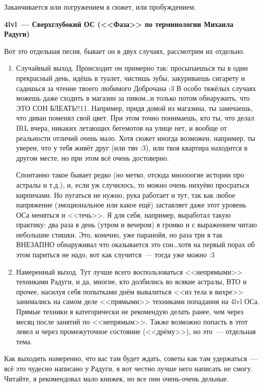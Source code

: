 \documentclass[a4paper,14pt,oneside]{memoir}
\begin{document}
Заканчивается или погружением в сюжет, или пробуждением.



\begin{center}
\textbf{4lvl~--- Сверхглубокий ОС (<<Фаза>> по терминологии Михаила Радуги)}
\end{center}


Вот это отдельная песня, бывает он в двух случаях, рассмотрим их отдельно.
\begin{enumerate}
\item Случайный выход. Происходит он примерно так: просыпаешься ты в один прекрасный день, идёшь в туалет, чистишь зубы, закуриваешь сигарету и садишься за чтение твоего любимого Доброчана :3 В особо тяжёлых случаях можешь даже сходить в магазин за пивом\ldots и только потом обнаружить, что ЭТО СОН БЛЕАТЬ!!11. Например, придя домой из магазина, ты замечаешь, что диван поменял свой цвет. При этом точно понимаешь, кто ты, что делал IRL вчера, никаких летающих бегемотов на улице нет, и вообще от реальности отличий очень мало. Хотя сюжет иногда возможен, например, ты уверен, что у тебя живёт друг (или тян :3), или твоя квартира находится в другом месте, но при этом всё очень достоверно.

Спонтанно такое бывает редко (но метко, отсюда мноооогие истории про астралы и т.д.), и, если уж случилось, то можно очень нихуёво просраться кирпичами. Но пугаться не нужно, рука работает и тут, так как любое напряжение (эмоциональное или какое ещё) заставляет даже этот уровень ОСа меняться и <<течь>>. Я для себя, например, выработал такую практику: два раза в день (утром и вечером) я громко и с выражением читаю небольшие стишки. Это, конечно, уже паранойя, но раза три я так ВНЕЗАПНО обнаруживал что оказывается это сон\ldots хотя на первый порах об этом париться не надо, вот как случится~--- тогда уже можно :3
\item Намеренный выход. Тут лучше всего воспользоваться <<не\-пря\-мы\-ми>> техниками Радуги, и да, многие, кто долбились во всякие астралы, ВТО и прочее, насилуя себя попытками днём вывалиться <<из тела в вихре>> занимались на самом деле <<прямыми>> техниками попадания на 4lvl ОСа. Прямые техники я категорически не рекомендую делать ранее, чем через месяц после занятий по <<непрямым>>. Также возможно попасть в этот левел и через промежуточное состояние (<<дрёму>>), но это~--- отдельная тема.
\end{enumerate} 
 
Как выходить намеренно, что вас там будет ждать, советы как там удержаться~--- всё это чудесно написано у Радуги, я вот честно лучше него написать не смогу. Читайте, я рекомендовал мало книжек, но все они очень-очень дельные.
\end{document}
